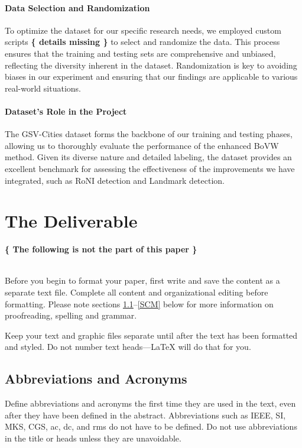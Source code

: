 \documentclass[conference]{IEEEtran}
\begin{document}
\paragraph{Data Selection and Randomization}
To optimize the dataset for our specific research needs, we employed custom scripts \textbf{ \{ details missing \} } to select and randomize the data. This process ensures that the training and testing sets are comprehensive and unbiased, reflecting the diversity inherent in the dataset. Randomization is key to avoiding biases in our experiment and ensuring that our findings are applicable to various real-world situations.

\paragraph{Dataset’s Role in the Project}
The GSV-Cities dataset forms the backbone of our training and testing phases, allowing us to thoroughly evaluate the performance of the enhanced BoVW method. Given its diverse nature and detailed labeling, the dataset provides an excellent benchmark for assessing the effectiveness of the improvements we have integrated, such as RoNI detection and Landmark detection.



\section{The Deliverable}


\textbf{ \{ The following is not the part of this paper \} }

\\

Before you begin to format your paper, first write and save the content as a 
separate text file. Complete all content and organizational editing before 
formatting. Please note sections \ref{AA}--\ref{SCM} below for more information on 
proofreading, spelling and grammar.

Keep your text and graphic files separate until after the text has been 
formatted and styled. Do not number text heads---{\LaTeX} will do that 
for you.

\subsection{Abbreviations and Acronyms}\label{AA}
Define abbreviations and acronyms the first time they are used in the text, 
even after they have been defined in the abstract. Abbreviations such as 
IEEE, SI, MKS, CGS, ac, dc, and rms do not have to be defined. Do not use 
abbreviations in the title or heads unless they are unavoidable.
\end{document}
